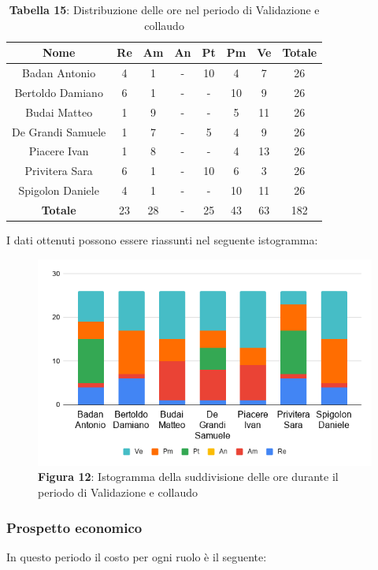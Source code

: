 \begin{table}[H]
	\centering
	\renewcommand{\arraystretch}{1.5}
	\begin{tabular}{|c|c|c|c|c|c|c|c|}
		\hline
		\rowcolor{lighter-grayer}
Nome & Re & Am & An & Pt & Pm & Ve & Totale \\ \hline
Badan Antonio & 4 & 1 & - & 10 & 4 & 7 & 26 \\ \hline
Bertoldo Damiano & 6 & 1 & - & - & 10 & 9 & 26 \\ \hline
Budai Matteo & 1 & 9 & - & - & 5 & 11 & 26 \\ \hline
De Grandi Samuele & 1 & 7 & - & 5 & 4 & 9 & 26 \\ \hline
Piacere Ivan & 1 & 8 & - & - & 4 & 13 & 26 \\ \hline
Privitera Sara & 6 & 1 & - & 10 & 6 & 3 & 26 \\ \hline
Spigolon Daniele & 4 & 1 & - & - & 10 & 11 & 26 \\ \hline
\textbf{Totale} & 23 & 28 & - & 25 & 43 & 63 & 182 \\ \hline
	\end{tabular}
	\caption*{\textbf{Tabella 15}: Distribuzione delle ore nel periodo di Validazione e collaudo\\}
\end{table}	
	I dati ottenuti possono essere riassunti nel seguente istogramma:

\begin{figure}[H]
	\centering
	\includegraphics[width=0.7\linewidth]{res/images/IstogrammaFase4.png}
	\caption*{\textbf{Figura 12}: Istogramma della suddivisione delle ore durante il periodo di Validazione e collaudo}
	\label{fig:Figura10}
\end{figure}
	
	
\subsubsection{Prospetto economico}
In questo periodo il costo per ogni ruolo è il seguente:

